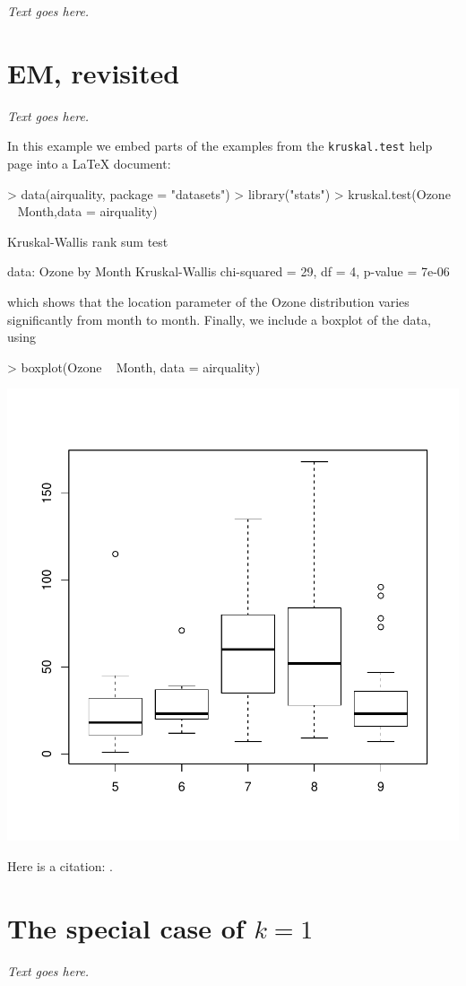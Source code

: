 \documentclass[final]{siamart171218}
\begin{document}
{\em Text goes here.}

\section{EM, revisited}

{\em Text goes here.}

In this example we embed parts of the examples from the
\texttt{kruskal.test} help page into a \LaTeX{} document:
\begin{Schunk}
\begin{Sinput}
> data(airquality, package = "datasets")
> library("stats")
> kruskal.test(Ozone ~ Month,data = airquality)
\end{Sinput}
\begin{Soutput}
	Kruskal-Wallis rank sum test

data:  Ozone by Month
Kruskal-Wallis chi-squared = 29, df = 4, p-value = 7e-06
\end{Soutput}
\end{Schunk}

which shows that the location parameter of the Ozone distribution
varies significantly from month to month. Finally, we include a
boxplot of the data, using
\begin{Schunk}
\begin{Sinput}
> boxplot(Ozone ~ Month, data = airquality)
\end{Sinput}
\end{Schunk}
\begin{center} 
\includegraphics{algorithms-003}
\end{center}

Here is a citation: \cite{lee-2001}.

\appendix

\section{The special case of $k = 1$}

{\em Text goes here.}



\end{document}
